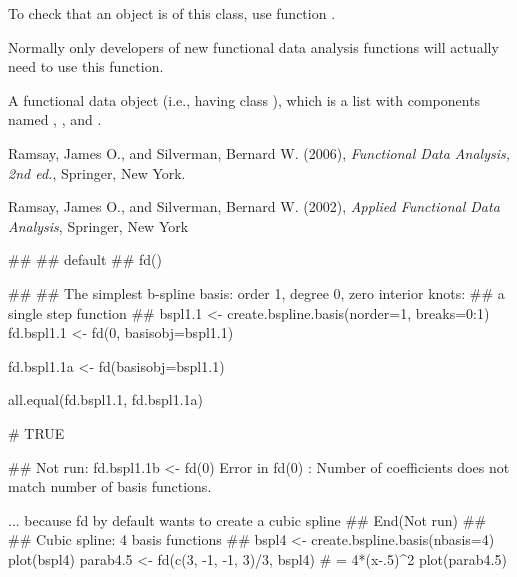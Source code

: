 \begin{Details}\relax
To check that an object is of this class, use function
.

Normally only developers of new functional data analysis
functions will actually need to use this function.
\end{Details}
\begin{Value}
A functional data object (i.e., having class ), which is a
list with components named , , and
.
\end{Value}
\begin{Source}\relax
Ramsay, James O., and Silverman, Bernard W. (2006), \emph{Functional
Data Analysis, 2nd ed.}, Springer, New York.

Ramsay, James O., and Silverman, Bernard W. (2002), \emph{Applied
Functional Data Analysis}, Springer, New York
\end{Source}
\begin{SeeAlso}\relax
{}
\end{SeeAlso}
\begin{Examples}
\begin{ExampleCode}
##
## default
##
fd()

##
## The simplest b-spline basis:  order 1, degree 0, zero interior knots:
##       a single step function
##
bspl1.1 <- create.bspline.basis(norder=1, breaks=0:1)
fd.bspl1.1 <- fd(0, basisobj=bspl1.1)

fd.bspl1.1a <- fd(basisobj=bspl1.1)

all.equal(fd.bspl1.1, fd.bspl1.1a)

# TRUE

## Not run: 
fd.bspl1.1b <- fd(0)
Error in fd(0) :
  Number of coefficients does not match number of basis functions.

... because fd by default wants to create a cubic spline
## End(Not run)
##
## Cubic spline:  4  basis functions
##
bspl4 <- create.bspline.basis(nbasis=4)
plot(bspl4)
parab4.5 <- fd(c(3, -1, -1, 3)/3, bspl4)
# = 4*(x-.5)^2
plot(parab4.5)

\end{ExampleCode}
\end{Examples}

